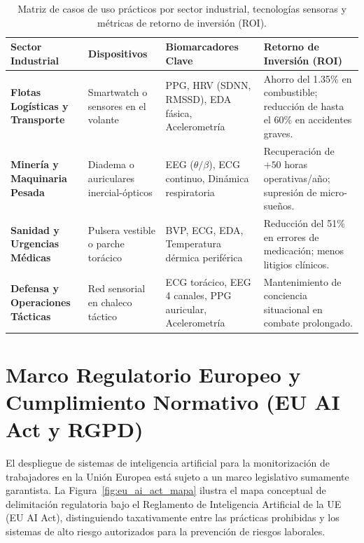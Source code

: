 \begin{table}[htbp]
\centering
\caption{Matriz de casos de uso prácticos por sector industrial, tecnologías sensoras y métricas de retorno de inversión (ROI).}
\label{tab:casos_uso_sectores}
\small
\renewcommand{\arraystretch}{0.95}
\begin{tabularx}{\linewidth}{@{}p{3.2cm}p{3.2cm}Xp{3.6cm}@{}}
\toprule
\textbf{Sector Industrial} & \textbf{Dispositivos} & \textbf{Biomarcadores Clave} & \textbf{Retorno de Inversión (ROI)} \\
\midrule
\textbf{Flotas Logísticas y Transporte} 
& Smartwatch o sensores en el volante 
& PPG, HRV (SDNN, RMSSD), EDA fásica, Acelerometría 
& Ahorro del 1.35\% en combustible; reducción de hasta el 60\% en accidentes graves. \\
\midrule
\textbf{Minería y Maquinaria Pesada} 
& Diadema o auriculares inercial-ópticos 
& EEG ($\theta/\beta$), ECG continuo, Dinámica respiratoria 
& Recuperación de $+50$ horas operativas/año; supresión de micro-sueños. \\
\midrule
\textbf{Sanidad y Urgencias Médicas} 
& Pulsera vestible o parche torácico 
& BVP, ECG, EDA, Temperatura dérmica periférica 
& Reducción del 51\% en errores de medicación; menos litigios clínicos. \\
\midrule
\textbf{Defensa y Operaciones Tácticas} 
& Red sensorial en chaleco táctico 
& ECG torácico, EEG 4 canales, PPG auricular, Acelerometría 
& Mantenimiento de conciencia situacional en combate prolongado. \\
\bottomrule
\end{tabularx}
\end{table}



\section{Marco Regulatorio Europeo y Cumplimiento Normativo (EU AI Act y RGPD)}
\label{sec:val_regulatorio}

El despliegue de sistemas de inteligencia artificial para la monitorización de trabajadores en la Unión Europea está sujeto a un marco legislativo sumamente garantista. La Figura~\ref{fig:eu_ai_act_mapa} ilustra el mapa conceptual de delimitación regulatoria bajo el Reglamento de Inteligencia Artificial de la UE (EU AI Act), distinguiendo taxativamente entre las prácticas prohibidas y los sistemas de alto riesgo autorizados para la prevención de riesgos laborales.

